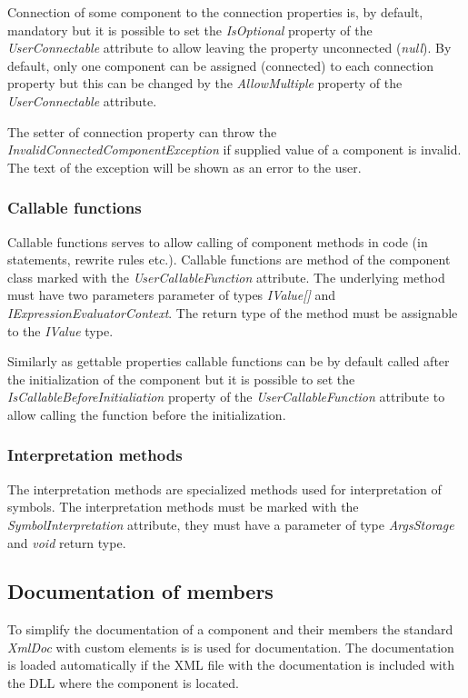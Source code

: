 Connection of some component to the connection properties is, by default, mandatory but it is possible to set the \emph{IsOptional} property of the \emph{UserConnectable} attribute to allow leaving the property unconnected (\emph{null}).
By default, only one component can be assigned (connected) to each connection property but this can be changed by the \emph{AllowMultiple} property of the \emph{UserConnectable} attribute.

The setter of connection property can throw the \emph{InvalidConnectedComponentException} if supplied value of a component is invalid.
The text of the exception will be shown as an error to the user.


\subsubsection{Callable functions}

Callable functions serves to allow calling of component methods in \lsystem code (in statements, rewrite rules etc.).
Callable functions are method of the component class marked with the \emph{UserCallableFunction} attribute.
The underlying method must have two parameters parameter of types \emph{IValue[]} and \emph{IExpressionEvaluatorContext}.
The return type of the method must be assignable to the \emph{IValue} type.

Similarly as gettable properties callable functions can be by default called after the initialization of the component but it is possible to set the \emph{IsCallableBeforeInitialiation} property of the \emph{UserCallableFunction} attribute to allow calling the function before the initialization.


\subsubsection{Interpretation methods}

The interpretation methods are specialized methods used for interpretation of \lsystem symbols.
The interpretation methods must be marked with the \emph{SymbolInterpretation} attribute, they must have a parameter of type \emph{ArgsStorage} and \emph{void} return type.


\subsection{Documentation of members}
\label{sec:componentDoc}

To simplify the documentation of a component and their members the standard \emph{XmlDoc} with custom elements is is used for documentation.
The documentation is loaded automatically if the XML file with the documentation is included with the DLL where the component is located.

